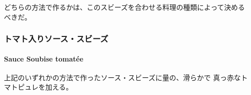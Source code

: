\begin{recette}
どちらの方法で作るかは、このスビーズを合わせる料理の種類によって決める
べきだ。

\maeaki

\hypertarget{ux30c8ux30deux30c8ux5165ux308aux30bdux30fcux30b9ux30b9ux30d3ux30fcux30ba}{%
\subsubsection{トマト入りソース・スビーズ}\label{ux30c8ux30deux30c8ux5165ux308aux30bdux30fcux30b9ux30b9ux30d3ux30fcux30ba}}

\hypertarget{sauce-soubise-tomatuxe9e}{%
\paragraph{Sauce Soubise tomatée}\label{sauce-soubise-tomatuxe9e}}


上記のいずれかの方法で作ったソース・スビーズに\untiers{}量の、滑らかで
真っ赤なトマトピュレを加える。
\end{recette}